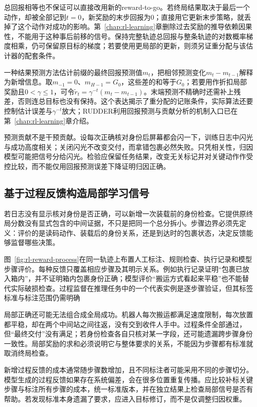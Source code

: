 总回报相等也不保证可以直接改用新的reward-to-go。若终局结果取决于最后一个动作，却被全部记到$t=0$，新奖励的末步回报为0；直接用它更新末步策略，就丢掉了这个动作对成功的影响。第~\ref{chap:rl-learning}章删除过去奖励的推导依赖因果性，不能用于这种事后前移的信号。保持完整轨迹总回报与整条轨迹的对数概率梯度相乘，仍可保留原目标的梯度；若要使用更局部的更新，则须另证重分配与该估计器的配套条件。

一种结果预测方法估计前缀的最终回报预测值$m_t$，把相邻预测变化$m_t-m_{t-1}$解释为新增信息。取$m_{-1}=0$、$m_{H-1}=G_0$，这些差的和等于$G_0$；若要用作折扣局部奖励且$0<\gamma\leq1$，可令$\widetilde r_t=\gamma^{-t}(m_t-m_{t-1})$。末端预测不精确时还需补上残差，否则连总目标也没有保持。这个表达揭示了重分配的记账条件，实际算法还要控制估计误差与$\gamma^{-t}$放大；RUDDER利用回报预测与贡献分析的机制入口已在第~\ref{chap:rl-learning}章介绍。

预测贡献不是干预贡献。设每次正确核对身份后屏幕都会闪一下，训练日志中闪光与成功高度相关；关闭闪光不改变交付，而拿错包裹必然失败。只凭相关性，归因模型可能把信号分给闪光。检验应保留任务结果，改变无关标记并对关键动作作受控比较，而不能仅用回报预测误差下降证明归因正确。

\subsection{基于过程反馈构造局部学习信号}
\label{sec:rl-reward-process}

若日志没有显示核对身份是否正确，可以新增一次装载前的身份检查。它提供原终局分数没有显式包含的中间证据，不只是把同一个总分拆小。步骤边界必须先定义：评价的是读码动作、装载后的身份关系，还是到达时的包裹状态，决定反馈能够监督哪些决策。

图~\ref{fig:rl-reward-process}在同一轨迹上布置人工标注、规则检查、执行记录和模型步骤评价。每种反馈只覆盖相应步骤及其明示关系。例如执行记录证明“包裹已放入箱内”，并不证明箱内包裹身份正确；模型评价“搬运方式看起来平稳”也不能替代实际破损检查。过程监督在推理任务中的一个代表实例是逐步骤验证，但其标签标准与标注范围仍需明确

局部正确还可能无法组合成全局成功。机器人每次搬运都满足速度限制，每次放置都平稳，却在两个中间站之间往返，没有交到收件人手中。过程条件全部通过，但“最终交付”没有满足；若身份检查各自只核对某一字段，还可能遗漏跨步骤身份一致性。局部奖励的求和必须说明它与整体要求的关系，不能因为步骤都有标准就取消终局检查。

新增过程反馈的成本通常随步骤数增加，且不同标注者可能采用不同的步骤切分。模型生成的过程反馈如果存在系统偏差，会在很多位置重复传播。应比较补标关键步骤与标注所有步骤的成本，统一标准版本，并在独立结果上检查局部信号是否有帮助。若发现标准本身遗漏了要求，应进入目标修订，而不是仅调整归因权重。

